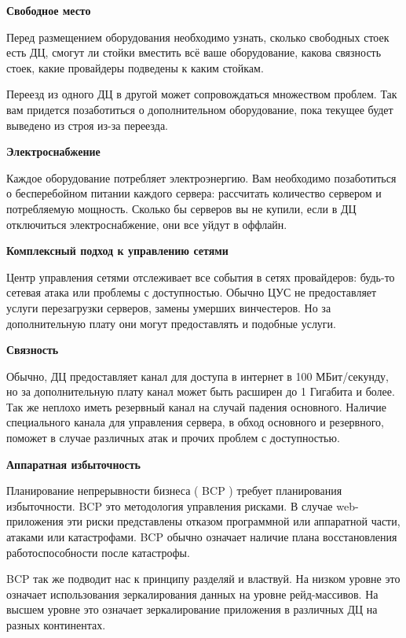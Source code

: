\textbf{ Свободное место } %

Перед размещением оборудования необходимо узнать, сколько свободных стоек есть ДЦ, смогут ли стойки вместить всё ваше оборудование, какова связность стоек, какие провайдеры подведены к каким стойкам.

Переезд из одного ДЦ в другой может сопровождаться множеством проблем. Так вам придется позаботиться о дополнительном оборудование, пока текущее будет выведено из строя из-за переезда.

\textbf{ Электроснабжение }%

Каждое оборудование потребляет электроэнергию. Вам необходимо позаботиться о бесперебойном питании каждого сервера: рассчитать количество сервером и потребляемую мощность. Сколько бы серверов вы не купили, если в ДЦ отключиться электроснабжение, они все уйдут в оффлайн.

\textbf{ Комплексный подход к управлению сетями }%

Центр управления сетями отслеживает все события в сетях провайдеров: будь-то сетевая атака или проблемы с доступностью. Обычно ЦУС не предоставляет услуги  перезагрузки серверов, замены умерших винчестеров. Но за дополнительную плату они могут предоставлять и подобные услуги.


\textbf{ Связность } %

Обычно, ДЦ предоставляет канал для доступа в интернет в 100 МБит/секунду, но за дополнительную плату канал может быть расширен до 1 Гигабита и более. Так же неплохо иметь резервный канал на случай падения основного. Наличие специального канала для управления сервера, в обход основного и резервного, поможет в случае различных атак и прочих проблем с доступностью.

\textbf{ Аппаратная избыточность }%

Планирование непрерывности бизнеса ( BCP ) требует планирования избыточности. BCP это методология управления рисками. В случае web-приложения эти риски представлены отказом программной или аппаратной части, атаками или катастрофами. BCP обычно означает наличие плана восстановления работоспособности после катастрофы.

BCP так же подводит нас к принципу разделяй и властвуй. На низком уровне это означает использования зеркалирования данных на уровне рейд-массивов. На высшем уровне это означает зеркалирование приложения в различных ДЦ на разных континентах.

